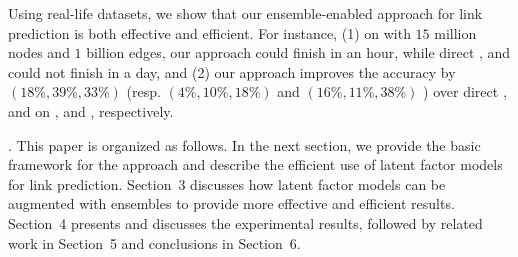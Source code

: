 Using real-life datasets, we show that our ensemble-enabled approach for link prediction is both effective and efficient.
For instance, (1) on \Friendster with $15$ million nodes and $1$ billion edges, our approach could finish in an
hour, while direct \NMF, \Aa \cite{adamic} and \BIGCLAM \cite{yang-wsdm2013} could not finish in a day, and
(2) our approach improves the accuracy by $(18\%, 39\%, 33\%)$ (resp. $(4\%, 10\%, 18\%)$ and $(16\%, 11\%, 38\%)$ )
over direct \NMF, \Aa and \BIGCLAM on \YouTube, \Flickr and \Wikipedia, respectively.


. This paper is organized as follows. In the next section, we  provide
the basic framework for the approach and describe the efficient use
of  latent factor models for link prediction. Section~3 discusses
how latent factor models can be augmented with ensembles to provide
more effective and efficient results. Section~4 presents and discusses the
experimental results, followed by related work in Section~5 and conclusions in Section~6.

